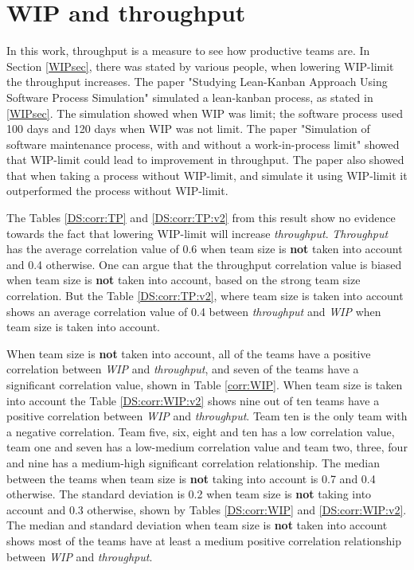 \documentclass[UKenglish]{ifimaster}  %
\begin{document}
\section{WIP and throughput} 
\vspace{-0.5em}
In this work, throughput is a measure to see how productive teams are. In Section \ref{WIPsec}, there was stated by various people, when lowering WIP-limit the {throughput} increases. The paper "Studying Lean-Kanban Approach Using Software Process Simulation" \parencite{DavidAnderson} simulated a  lean-kanban process, as stated in \ref{WIPsec}. The simulation showed when WIP was limit; the software process used 100 days and 120 days when WIP was not limit. The paper "Simulation of software maintenance process, with and without a work-in-process limit" \parencite{SMR:SMR1599} showed that WIP-limit could lead to improvement in throughput. The paper also showed that when taking a process without WIP-limit, and simulate it using WIP-limit it outperformed the process without WIP-limit.


The Tables \ref{DS:corr:TP} and \ref{DS:corr:TP:v2} from this result show no evidence towards the fact that lowering WIP-limit will increase \textit{throughput}. \textit{Throughput} has the average correlation value of 0.6 when team size is \textbf{not} taken into account and 0.4 otherwise. One can argue that the throughput correlation value is biased when team size is \textbf{not} taken into account, based on the strong team size correlation. But the Table \ref{DS:corr:TP:v2}, where team size is taken into account shows an average correlation value of 0.4 between \textit{throughput} and \textit{WIP} when team size is taken into account.

When team size is \textbf{not} taken into account,  all of the teams have a positive correlation between \textit{WIP} and \textit{throughput}, and seven of the teams have a significant correlation value, shown in Table \ref{corr:WIP}.  When team size is taken into account the Table \ref{DS:corr:WIP:v2}  shows nine out of ten teams have a positive correlation between \textit{WIP} and \textit{throughput}. Team ten is the only team with a negative correlation.  Team five, six, eight and ten has a low correlation value, team one and seven has a low-medium correlation value and team two, three, four and nine has a medium-high significant correlation relationship. The median between the teams when team size is \textbf{not} taking into account is 0.7 and 0.4 otherwise. The standard deviation is 0.2 when team size is \textbf{not} taking into account and 0.3 otherwise, shown by Tables \ref{DS:corr:WIP} and \ref{DS:corr:WIP:v2}. The median and standard deviation when team size is \textbf{not} taken into account shows most of the teams have at least a medium positive correlation relationship between \textit{WIP} and \textit{throughput}. 
\end{document}
